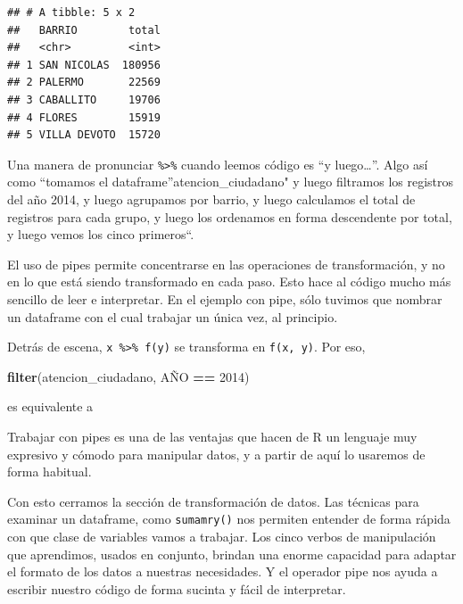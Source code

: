 \documentclass[]{book}
\newenvironment{Shaded}{\begin{snugshade}}{\end{snugshade}}
\newcommand{\KeywordTok}[1]{\textcolor[rgb]{0.13,0.29,0.53}{\textbf{#1}}}
\newcommand{\DecValTok}[1]{\textcolor[rgb]{0.00,0.00,0.81}{#1}}
\newcommand{\StringTok}[1]{\textcolor[rgb]{0.31,0.60,0.02}{#1}}
\newcommand{\OperatorTok}[1]{\textcolor[rgb]{0.81,0.36,0.00}{\textbf{#1}}}
\newcommand{\NormalTok}[1]{#1}
\begin{document}
\begin{verbatim}
## # A tibble: 5 x 2
##   BARRIO        total
##   <chr>         <int>
## 1 SAN NICOLAS  180956
## 2 PALERMO       22569
## 3 CABALLITO     19706
## 4 FLORES        15919
## 5 VILLA DEVOTO  15720
\end{verbatim}

Una manera de pronunciar \texttt{\%\textgreater{}\%} cuando leemos
código es ``y luego\ldots{}''. Algo así como ``tomamos el
dataframe''atencion\_ciudadano" y luego filtramos los registros del año
2014, y luego agrupamos por barrio, y luego calculamos el total de
registros para cada grupo, y luego los ordenamos en forma descendente
por total, y luego vemos los cinco primeros``.

El uso de pipes permite concentrarse en las operaciones de
transformación, y no en lo que está siendo transformado en cada paso.
Esto hace al código mucho más sencillo de leer e interpretar. En el
ejemplo con pipe, sólo tuvimos que nombrar un dataframe con el cual
trabajar un única vez, al principio.

Detrás de escena, \texttt{x\ \%\textgreater{}\%\ f(y)} se transforma en
\texttt{f(x,\ y)}. Por eso,

\begin{Shaded}
\begin{Highlighting}[]
\KeywordTok{filter}\NormalTok{(atencion_ciudadano, AÑO }\OperatorTok{==}\StringTok{ }\DecValTok{2014}\NormalTok{)}
\end{Highlighting}
\end{Shaded}

es equivalente a

\begin{Shaded}
\end{Shaded}

Trabajar con pipes es una de las ventajas que hacen de R un lenguaje muy
expresivo y cómodo para manipular datos, y a partir de aquí lo usaremos
de forma habitual.

Con esto cerramos la sección de transformación de datos. Las técnicas
para examinar un dataframe, como \texttt{sumamry()} nos permiten
entender de forma rápida con que clase de variables vamos a trabajar.
Los cinco verbos de manipulación que aprendimos, usados en conjunto,
brindan una enorme capacidad para adaptar el formato de los datos a
nuestras necesidades. Y el operador pipe nos ayuda a escribir nuestro
código de forma sucinta y fácil de interpretar.
\end{document}
